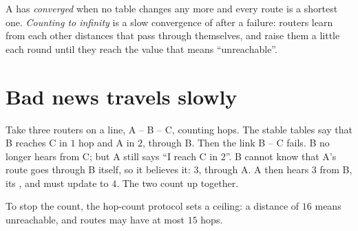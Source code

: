 \begin{definition}\label{def:g12:routing:convergence}
A  has \emph{converged} when no table changes any more and every route is a
shortest one. \emph{Counting to infinity} is a slow convergence of  after a failure: routers learn from each other distances that pass through themselves, and raise them a
little each round until they reach the value that means ``unreachable''.
\end{definition}

\section{Bad news travels slowly}\label{sec:g12:routing:infinity}

Take three routers on a line, A -- B -- C, counting hops. The stable tables say that B reaches C in $1$ hop and A in
$2$, through B. Then the link B -- C fails. B no longer hears from C; but A still says ``I reach C in $2$''. B cannot
know that A's route goes through B itself, so it believes it: $3$, through A. A then hears $3$ from B, its ,
and must update to $4$. The two count up together.

To stop the count, the hop-count protocol sets a ceiling: a distance of $16$ means unreachable, and routes may have at
most $15$ hops.

\label{lst:g12:routing:infinity}

\label{out:g12:routing:infinity}


